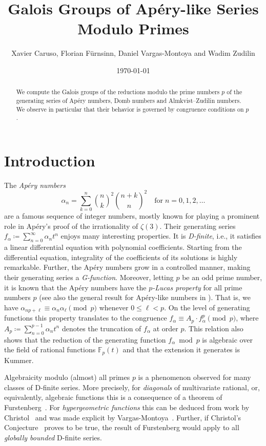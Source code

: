 \documentclass{article}
\title{Galois Groups of Apéry-like Series Modulo Primes}
\author{Xavier Caruso, Florian Fürnsinn, Daniel Vargas-Montoya and Wadim Zudilin}
\date\today
\newcommand{\F}{\mathbb{F}}
\theoremstyle{definition}
\theoremstyle{plain}
\theoremstyle{remark}
\begin{document}
\maketitle

\begin{abstract}
We compute the Galois groups of the reductions
modulo the prime numbers $p$ of the generating series of 
Apéry numbers, Domb numbers and Almkvist--Zudilin numbers.
We observe in particular that their behavior is governed
by congruence conditions on $p$.
\end{abstract}

\section{Introduction}

The \emph{Apéry numbers} \begin{equation*}
\alpha_n = \sum_{k=0}^n{\binom nk}^2{\binom{n+k}n}^2 \quad\text{for}\; n=0,1,2,\dots
\end{equation*} are a famous sequence of integer numbers, mostly known for playing a prominent role in Apéry's proof \cite{Ape79} of the irrationality of $\zeta(3)$. Their generating series $f_\alpha\coloneqq \sum_{n=0}^\infty \alpha_n t^n$  enjoys many interesting properties. It is \emph{D-finite}, i.e., it satisfies a linear differential equation with polynomial coefficients. Starting from the differential equation, integrality of the coefficients of its solutions is highly remarkable. Further, the Apéry numbers grow in a controlled manner, making their generating series a \emph{G-function}. Moreover, letting $p$ be an odd prime number, it is known \cite[Theorem 1]{Gessel} that the Apéry numbers have the 
\emph{$p$-Lucas property} for all prime numbers $p$ (see also the general 
result for Apéry-like numbers in \cite{Malik-Straub}). That is, we have 
$\alpha_{np+\ell}\equiv \alpha_n \alpha_\ell \pmod p$ whenever $0 \leq 
\ell < p$. On the level of generating functions this property translates 
to the congruence $f_\alpha \equiv A_p\cdot f_\alpha^p \pmod p$, where 
$A_p \coloneqq \sum_{n=0}^{p-1} \alpha_n t^n$ denotes the truncation 
of $f_\alpha$ at order $p$. This relation also shows that the 
reduction of the generating function $f_\alpha\bmod p$ is algebraic 
over the field of rational functions $\F_p(t)$ and that the extension
it generates is Kummer. 

Algebraicity modulo (almost) all primes $p$ is a phenomenon observed for many classes of D-finite series. More precisely, for \emph{diagonals} of multivariate rational, or, equivalently, algebraic functions this is a consequence of a theorem of Furstenberg~\cite{Fur67}. For \emph{hypergeometric functions} this can be deduced from work by Christol~\cite{Chr86a} and was made explicit by Vargas-Montoya~\cite{Var21}. Further, if Christol's Conjecture~\cite{Chr86} proves to be true, the result of Furstenberg would apply to all \emph{globally bounded} D-finite series.
\end{document}
